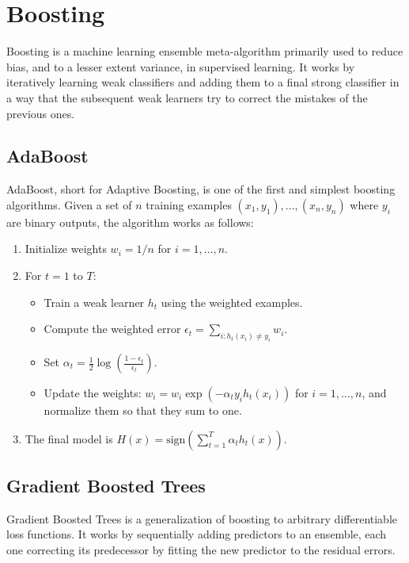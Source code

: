\chapter{Boosting}


Boosting is a machine learning ensemble meta-algorithm primarily used to reduce bias, and to a lesser extent variance, in supervised learning. It works by iteratively learning weak classifiers and adding them to a final strong classifier in a way that the subsequent weak learners try to correct the mistakes of the previous ones.

\section{AdaBoost}

AdaBoost, short for Adaptive Boosting, is one of the first and simplest boosting algorithms. Given a set of $n$ training examples $(x_1, y_1), \ldots, (x_n, y_n)$ where $y_i$ are binary outputs, the algorithm works as follows:

\begin{enumerate}
    \item Initialize weights $w_i = 1/n$ for $i = 1, \ldots, n$.
    \item For $t = 1$ to $T$:
    \begin{itemize}
        \item Train a weak learner $h_t$ using the weighted examples.
        \item Compute the weighted error $\epsilon_t = \sum_{i:h_t(x_i) \neq y_i} w_i$.
        \item Set $\alpha_t = \frac{1}{2} \log \left(\frac{1-\epsilon_t}{\epsilon_t}\right)$.
        \item Update the weights: $w_i = w_i \exp(-\alpha_t y_i h_t(x_i))$ for $i = 1, \ldots, n$, and normalize them so that they sum to one.
    \end{itemize}
    \item The final model is $H(x) = \text{sign}\left(\sum_{t=1}^{T} \alpha_t h_t(x)\right)$.
\end{enumerate}

\section{Gradient Boosted Trees}

Gradient Boosted Trees is a generalization of boosting to arbitrary differentiable loss functions. It works by sequentially adding predictors to an ensemble, each one correcting its predecessor by fitting the new predictor to the residual errors.

